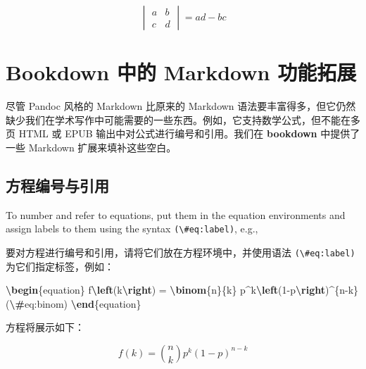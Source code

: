 \documentclass[
  12pt,
]{krantz}
\newenvironment{Shaded}{\begin{snugshade}}{\end{snugshade}}
\newcommand{\ExtensionTok}[1]{#1}
\newcommand{\KeywordTok}[1]{\textcolor[rgb]{0.13,0.29,0.53}{\textbf{#1}}}
\newcommand{\NormalTok}[1]{#1}
\newcommand{\SpecialCharTok}[1]{\textcolor[rgb]{0.81,0.36,0.00}{\textbf{#1}}}
\newcommand{\SpecialStringTok}[1]{\textcolor[rgb]{0.31,0.60,0.02}{#1}}
\theoremstyle{definition}
\theoremstyle{definition}
\theoremstyle{definition}
\theoremstyle{definition}
\theoremstyle{remark}
\begin{document}
\[\begin{vmatrix}a & b\\
c & d
\end{vmatrix}=ad-bc\]

\section{Bookdown 中的 Markdown 功能拓展}\label{bookdown-ux4e2dux7684-markdown-ux529fux80fdux62d3ux5c55}

尽管 Pandoc 风格的 Markdown 比原来的 Markdown 语法要丰富得多，但它仍然缺少我们在学术写作中可能需要的一些东西。例如，它支持数学公式，但不能在多页 HTML 或 EPUB 输出中对公式进行编号和引用。我们在 \textbf{bookdown} 中提供了一些 Markdown 扩展来填补这些空白。

\subsection{方程编号与引用}\label{equations}

To number and refer to equations, put them in the equation environments and assign labels to them using the syntax \texttt{(\textbackslash{}\#eq:label)}, e.g.,

要对方程进行编号和引用，请将它们放在方程环境中，并使用语法 \texttt{(\textbackslash{}\#eq:label)} 为它们指定标签，例如：

\begin{Shaded}
\begin{Highlighting}[]
\KeywordTok{\textbackslash{}begin}\NormalTok{\{}\ExtensionTok{equation}\NormalTok{\}}\SpecialStringTok{ }
\SpecialStringTok{  f}\SpecialCharTok{\textbackslash{}left}\SpecialStringTok{(k}\SpecialCharTok{\textbackslash{}right}\SpecialStringTok{) = }\SpecialCharTok{\textbackslash{}binom}\SpecialStringTok{\{n\}\{k\} p\^{}k}\SpecialCharTok{\textbackslash{}left}\SpecialStringTok{(1{-}p}\SpecialCharTok{\textbackslash{}right}\SpecialStringTok{)\^{}\{n{-}k\}}
\SpecialStringTok{  (}\SpecialCharTok{\textbackslash{}\#}\SpecialStringTok{eq:binom)}
\KeywordTok{\textbackslash{}end}\NormalTok{\{}\ExtensionTok{equation}\NormalTok{\} }
\end{Highlighting}
\end{Shaded}

方程将展示如下：

\begin{equation}
f\left(k\right)=\binom{n}{k}p^k\left(1-p\right)^{n-k} \label{eq:binom}
\end{equation}
\end{document}
